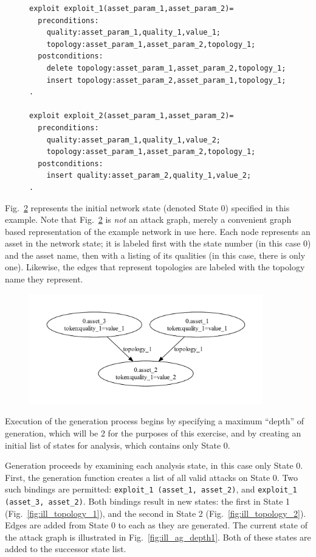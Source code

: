 \begin{figure}
\begin{lstlisting}
exploit exploit_1(asset_param_1,asset_param_2)=
  preconditions:
    quality:asset_param_1,quality_1,value_1;
    topology:asset_param_1,asset_param_2,topology_1;
  postconditions:
    delete topology:asset_param_1,asset_param_2,topology_1;
    insert topology:asset_param_2,asset_param_1,topology_1;
.

exploit exploit_2(asset_param_1,asset_param_2)=
  preconditions:
    quality:asset_param_1,quality_1,value_2;
    topology:asset_param_1,asset_param_2,topology_1;
  postconditions:
    insert quality:asset_param_2,quality_1,value_2;
.
\end{lstlisting}
\label{fig:ill_xp}
\end{figure}

Fig.~\ref{fig:ill_topology_0} represents the initial network state 
(denoted State 0) specified
in this example. Note that Fig.~\ref{fig:ill_topology_0} is \emph{not} an attack
graph, merely a convenient graph based representation of the example network
in use here. Each node represents an asset in the network state; it is labeled
first with the state number (in this case 0) and the asset name, then with a
listing of its qualities (in this case, there is only one).
Likewise, the edges that represent topologies
are labeled with the topology name they represent.

\begin{figure}
\includegraphics[width=4in]{ag_illustrative_simple/nm_state0}
\label{fig:ill_topology_0}
\end{figure}

Execution of the generation process begins by specifying a maximum ``depth''
of generation, which will be 2 for the purposes of this exercise, and by creating
an initial list of states for analysis, which contains only State 0.

Generation proceeds by examining each analysis state, in this case only State 0.
First, the generation function creates a list of all valid
attacks on State 0. Two such bindings are permitted: \texttt{exploit\_1 (asset\_1, asset\_2)},
and \texttt{exploit\_1 (asset\_3, asset\_2)}. Both bindings result in new states:
the first in State 1 (Fig.~\ref{fig:ill_topology_1}), and the second in State 2
(Fig.~\ref{fig:ill_topology_2}). Edges are added from State 0 to each as they are
generated. The current state of the attack graph is illustrated in 
Fig.~\ref{fig:ill_ag_depth1}. Both of these states are added to the
successor state list.

